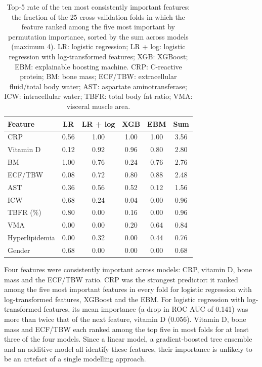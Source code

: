 \documentclass[conference]{IEEEtran}
\begin{document}
\begin{table}[h]
\centering
\caption{Top-5 rate of the ten most consistently important features: the
fraction of the 25 cross-validation folds in which the feature ranked among the
five most important by permutation importance, sorted by the sum across models
(maximum 4). LR: logistic regression; LR + log: logistic regression with
log-transformed features; XGB: XGBoost; EBM: explainable boosting machine.
CRP: C-reactive protein; BM: bone mass; ECF/TBW: extracellular fluid/total body
water; AST: aspartate aminotransferase; ICW: intracellular water; TBFR: total
body fat ratio; VMA: visceral muscle area.}
\small
\begin{tabular}{lccccc}
\toprule
Feature & LR & LR + log & XGB & EBM & Sum \\
\midrule
CRP            & 0.56 & 1.00 & 1.00 & 1.00 & 3.56 \\
Vitamin D      & 0.12 & 0.92 & 0.96 & 0.80 & 2.80 \\
BM             & 1.00 & 0.76 & 0.24 & 0.76 & 2.76 \\
ECF/TBW        & 0.08 & 0.72 & 0.80 & 0.88 & 2.48 \\
AST            & 0.36 & 0.56 & 0.52 & 0.12 & 1.56 \\
ICW            & 0.68 & 0.24 & 0.04 & 0.00 & 0.96 \\
TBFR (\%)      & 0.80 & 0.00 & 0.16 & 0.00 & 0.96 \\
VMA            & 0.00 & 0.00 & 0.20 & 0.64 & 0.84 \\
Hyperlipidemia & 0.00 & 0.32 & 0.00 & 0.44 & 0.76 \\
Gender         & 0.68 & 0.00 & 0.00 & 0.00 & 0.68 \\
\bottomrule
\end{tabular}
\label{tab:top5_rate}
\end{table}

Four features were consistently important across models: CRP, vitamin D, bone
mass and the ECF/TBW ratio. CRP was the strongest predictor: it ranked among
the five most important features in every fold for logistic regression with
log-transformed features, XGBoost and the EBM. For logistic regression with
log-transformed features, its mean importance (a drop in ROC AUC of 0.141) was
more than twice that of the next feature, vitamin D (0.056). Vitamin D, bone
mass and ECF/TBW each ranked among the top five in most folds for at least
three of the four models. Since a linear model, a gradient-boosted tree
ensemble and an additive model all identify these features, their importance is
unlikely to be an artefact of a single modelling approach.
\end{document}
